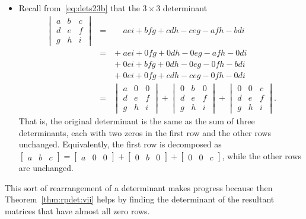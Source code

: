\begin{example}
\begin{itemize}
\item Recall from~\eqref{eq:dets23b} that the \(3\times3\) determinant
\begin{eqnarray*}
\begin{vmatrix} a&b&c\\d&e&f\\g&h&i \end{vmatrix}
&=&\phantom{{}+}aei+bfg+cdh-ceg-afh-bdi
\\&=&{}+aei+0fg+0dh-0eg-afh-0di
\\&&{}+0ei+bfg+0dh-0eg-0fh-bdi
\\&&{}+0ei+0fg+cdh-ceg-0fh-0di
\\&=&\begin{vmatrix} a&0&0\\d&e&f\\g&h&i \end{vmatrix}
+\begin{vmatrix} 0&b&0\\d&e&f\\g&h&i \end{vmatrix}
+\begin{vmatrix} 0&0&c\\d&e&f\\g&h&i \end{vmatrix}.
\end{eqnarray*}
That is, the original determinant is the same as the sum of three determinants, each with two zeros in the first row and the other rows unchanged.
Equivalently, the first row is decomposed as \(\begin{bmatrix} a&b&c \end{bmatrix}=\begin{bmatrix} a&0&0 \end{bmatrix}+\begin{bmatrix} 0&b&0 \end{bmatrix}+\begin{bmatrix} 0&0&c \end{bmatrix}\), while the other rows are unchanged.
\end{itemize}
This sort of rearrangement of a determinant makes progress because then Theorem~\ref{thm:rpdet:vii} helps by finding the determinant of the resultant matrices that have almost all zero rows.
\end{example}

